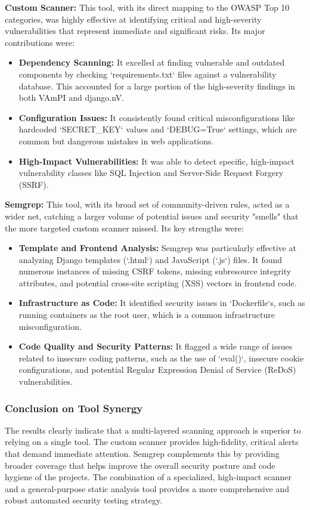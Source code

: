 \textbf{Custom Scanner:} This tool, with its direct mapping to the OWASP Top 10 categories, was highly effective at identifying critical and high-severity vulnerabilities that represent immediate and significant risks. Its major contributions were:
\begin{itemize}
    \item \textbf{Dependency Scanning:} It excelled at finding vulnerable and outdated components by checking `requirements.txt` files against a vulnerability database. This accounted for a large portion of the high-severity findings in both VAmPI and django.nV.
    \item \textbf{Configuration Issues:} It consistently found critical misconfigurations like hardcoded `SECRET_KEY` values and `DEBUG=True` settings, which are common but dangerous mistakes in web applications.
    \item \textbf{High-Impact Vulnerabilities:} It was able to detect specific, high-impact vulnerability classes like SQL Injection and Server-Side Request Forgery (SSRF).
\end{itemize}

\textbf{Semgrep:} This tool, with its broad set of community-driven rules, acted as a wider net, catching a larger volume of potential issues and security "smells" that the more targeted custom scanner missed. Its key strengths were:
\begin{itemize}
    \item \textbf{Template and Frontend Analysis:} Semgrep was particularly effective at analyzing Django templates (`.html`) and JavaScript (`.js`) files. It found numerous instances of missing CSRF tokens, missing subresource integrity attributes, and potential cross-site scripting (XSS) vectors in frontend code.
    \item \textbf{Infrastructure as Code:} It identified security issues in `Dockerfile`s, such as running containers as the root user, which is a common infrastructure misconfiguration.
    \item \textbf{Code Quality and Security Patterns:} It flagged a wide range of issues related to insecure coding patterns, such as the use of `eval()`, insecure cookie configurations, and potential Regular Expression Denial of Service (ReDoS) vulnerabilities.
\end{itemize}

\subsubsection*{Conclusion on Tool Synergy}
The results clearly indicate that a multi-layered scanning approach is superior to relying on a single tool. The custom scanner provides high-fidelity, critical alerts that demand immediate attention. Semgrep complements this by providing broader coverage that helps improve the overall security posture and code hygiene of the projects. The combination of a specialized, high-impact scanner and a general-purpose static analysis tool provides a more comprehensive and robust automated security testing strategy.
